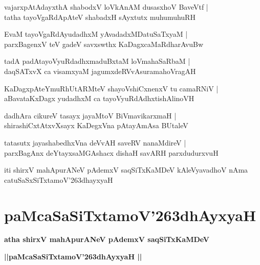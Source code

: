 \documentclass[twoside,12pt,openright]{book}
\def\S{\char'263}
\newcounter{shloka}[chapter]
\begin{document}
\begin{shloka}%
vajarxpAtAdayxthA shabodxV loVkAnAM dusasxhoV BaveVtf |\\
tatha tayoVgaRdApAteV shabadxH sAyxtutx muhumuhuRH 
\end{shloka}

\begin{shloka}%
EvaM tayoVgaRdAyudadhxM yAvadadxMDatuSaTxyaM |\\
parxBagenxV teV gadeV savxswthx KaDagxcaMaRdharAvuBw 
\end{shloka}

\begin{shloka}%
tadA padAtayoVyuRdadhxmaduBxtaM loVmahaSaRbaM |\\
daqSATxvX ca visamxyaM jagumxdeRVvAsuramahoVragAH 
\end{shloka}

\begin{shloka}%
KaDagxpAteYmuRhUtARMteV shayoVshiCxnenxV tu camaRNiV |\\
aBavataKxDagx yudadhxM ca tayoVyuRdAdhxtishAlinoVH 
\end{shloka}

\begin{shloka}%
dadhAra cikureV tasayx jayaMtoV BiVmavikarxmaH |\\
shirashiCxtAtxvXsayx KaDegxVna pAtayAmAsa BUtaleV
\end{shloka}

\begin{shloka}%
tatasutx jayashabedhxVna deVvAH saveRV nanaMdireV |\\
parxBagAnx deYtayxsaMGAshacx dishaH savARH parxdudurxvuH 
\end{shloka}

\begin{center}
iti shirxV mahApurANeV pAdemxV saqSiTxKaMDeV kAleVyavadhoV nAma catuSaSxSiTxtamoV\S dhayxyaH 
\end{center}


\chapter{paMcaSaSiTxtamoV\S dhAyxyaH}

\begin{center}
{\LARGE\bfseries atha shirxV mahApurANeV pAdemxV saqSiTxKaMDeV}
\end{center}

\begin{center}
{\LARGE\bfseries ||paMcaSaSiTxtamoV\S dhAyxyaH || }
\end{center}
\end{document}

